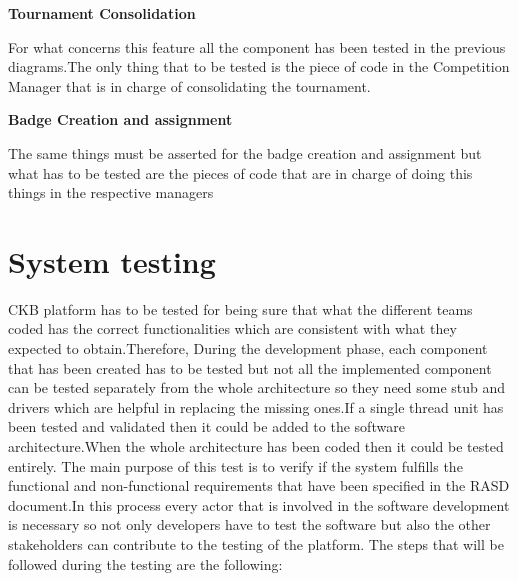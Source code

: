 \begin{enumerate}[label={[\textbf{F\arabic*}]}]
\newpage
\item \textbf{Tournament Consolidation}

For what concerns this feature all the component has been tested in the previous diagrams.The only thing that to be tested is the piece of code in the Competition Manager that is in charge of consolidating the tournament. 

\item \textbf{Badge Creation and assignment}

The same things must be asserted for the badge creation and assignment but what has to be tested are the pieces of code that are in charge of doing this things in the respective managers    

\end{enumerate}

\newpage
\section{System testing}
CKB platform has to be tested for being sure that what the different teams coded has the correct functionalities which are consistent with what they expected to obtain.Therefore, During the development phase, each component that has been created has to be tested but not all the implemented component can be tested separately from the whole architecture so they need some stub and drivers which are helpful in replacing the missing ones.If a single thread unit has been tested and validated then it could be added to the software architecture.When the whole architecture has been coded then it could be tested entirely. The main purpose of this test is to verify if the system fulfills the functional and non-functional requirements that have been specified in the RASD document.In this process every actor that is involved in the software development is necessary so not only developers have to test the software but also the other stakeholders can contribute to the testing of the platform. The steps that will be followed during the testing are the following:
\\
